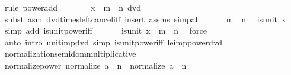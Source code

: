 \begin{isabellebody}
\ {\isacharparenleft}{\kern0pt}rule\ power{\isacharunderscore}{\kern0pt}add{\isacharparenright}{\kern0pt}\isanewline
\ \ \ \ \isamarkupfalse%
\ \isamarkupfalse%
\ {\isachardoublequoteopen}x\ {\isacharcircum}{\kern0pt}\ {\isacharparenleft}{\kern0pt}m\ {\isacharminus}{\kern0pt}\ n{\isacharparenright}{\kern0pt}\ dvd\ {}{\isachardoublequoteclose}\isanewline
\ \ \ \ \ \ \isamarkupfalse%
\ {\isacharparenleft}{\kern0pt}subst\ {\isacharparenleft}{\kern0pt}asm{\isacharparenright}{\kern0pt}\ dvd{\isacharunderscore}{\kern0pt}times{\isacharunderscore}{\kern0pt}left{\isacharunderscore}{\kern0pt}cancel{\isacharunderscore}{\kern0pt}iff{\isacharparenright}{\kern0pt}\ {\isacharparenleft}{\kern0pt}insert\ assms{\isacharcomma}{\kern0pt}\ simp{\isacharunderscore}{\kern0pt}all{\isacharparenright}{\kern0pt}\isanewline
\ \ \ \ \isamarkupfalse%
\ {\isacartoucheopen}m\ {\isachargreater}{\kern0pt}\ n{\isacartoucheclose}\ \isamarkupfalse%
\ {\isachardoublequoteopen}is{\isacharunderscore}{\kern0pt}unit\ x{\isachardoublequoteclose}\ \isamarkupfalse%
\ {\isacharparenleft}{\kern0pt}simp\ add{\isacharcolon}{\kern0pt}\ is{\isacharunderscore}{\kern0pt}unit{\isacharunderscore}{\kern0pt}power{\isacharunderscore}{\kern0pt}iff{\isacharparenright}{\kern0pt}\isanewline
\ \ \isacommand{{\isacharbraceright}{\kern0pt}}\isamarkupfalse%
\isanewline
\ \ \isamarkupfalse%
\ {\isachardoublequoteopen}is{\isacharunderscore}{\kern0pt}unit\ x\ {\isasymor}\ m\ {\isasymle}\ n{\isachardoublequoteclose}\ \isamarkupfalse%
\ force\isanewline
{}\isamarkupfalse%
\ {\isacharparenleft}{\kern0pt}auto\ intro{\isacharcolon}{\kern0pt}\ unit{\isacharunderscore}{\kern0pt}imp{\isacharunderscore}{\kern0pt}dvd\ simp{\isacharcolon}{\kern0pt}\ is{\isacharunderscore}{\kern0pt}unit{\isacharunderscore}{\kern0pt}power{\isacharunderscore}{\kern0pt}iff\ le{\isacharunderscore}{\kern0pt}imp{\isacharunderscore}{\kern0pt}power{\isacharunderscore}{\kern0pt}dvd{\isacharparenright}{\kern0pt}%
\endisatagproof
{\isafoldproof}%
%
\isadelimproof
\isanewline
%
\endisadelimproof
\isanewline
\isanewline
{}\isamarkupfalse%
\isanewline
\isanewline
{}\isamarkupfalse%
\ normalization{\isacharunderscore}{\kern0pt}semidom{\isacharunderscore}{\kern0pt}multiplicative\isanewline
{}\isanewline
\isanewline
{}\isamarkupfalse%
\ normalize{\isacharunderscore}{\kern0pt}power{\isacharcolon}{\kern0pt}\ {\isachardoublequoteopen}normalize\ {\isacharparenleft}{\kern0pt}a\ {\isacharcircum}{\kern0pt}\ n{\isacharparenright}{\kern0pt}\ {\isacharequal}{\kern0pt}\ normalize\ a\ {\isacharcircum}{\kern0pt}\ n{\isachardoublequoteclose}\isanewline

\end{isabellebody}
